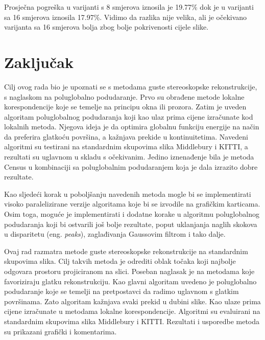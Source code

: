 \documentclass[utf8, zavrsni, numeric]{fer}
\begin{document}
Prosječna pogreška u varijanti s 8 smjerova iznosila je 19.77\% dok je u varijanti sa 16
smjerova iznosila 17.97\%. Vidimo da razlika nije velika, ali je očekivano varijanta sa 16 smjerova bolja zbog bolje pokrivenosti cijele slike.

\chapter{Zaključak}
Cilj ovog rada bio je upoznati se s metodama guste stereoskopske rekonstrukcije, s naglaskom
na poluglobalno podudaranje. Prvo su obrađene metode lokalne korespondencije koje se temelje
na principu okna ili prozora. Zatim je uveden algoritam poluglobalnog podudaranja koji kao ulaz
prima cijene izračunate kod lokalnih metoda. Njegova ideja je da optimira globalnu funkciju energije na način da preferira glatkoću površina, a kažnjava prekide u kontinuitetima.
Navedeni algoritmi su testirani na standardnim skupovima slika Middlebury i KITTI, a rezultati
su uglavnom u skladu s očekivanim. Jedino iznenađenje bila je metoda Census u kombinaciji sa poluglobalnim podudaranjem koja je dala izrazito dobre rezultate.

Kao sljedeći korak u poboljšanju navedenih metoda mogle bi se implementirati visoko paralelizirane verzije algoritama
koje bi se izvodile na grafičkim karticama. Osim toga, moguće je implementirati i dodatne
korake u algoritmu poluglobalnog podudaranja koji bi ostvarili još bolje rezultate, poput
uklanjanja naglih skokova u disparitetu (eng. {\sl peaks}), zaglađivanja Gaussovim filtrom i tako dalje.




\begin{sazetak}
  Ovaj rad razmatra metode guste stereoskopske rekonstrukcije na standardnim skupovima slika.
  Cilj takvih metoda je odrediti oblak točaka koji najbolje odgovara prostoru projiciranom
  na slici.
  Poseban naglasak je na metodama koje favoriziraju glatku rekonstrukciju. Kao glavni
  algoritam uvedeno je poluglobalno podudaranje koje se temelji na pretpostavci da radimo
  uglavnom s glatkim površinama. Zato algoritam kažnjava svaki prekid u dubini slike. Kao
  ulaze prima cijene izračunate u metodama lokalne korespondencije. Algoritmi su
  evaluirani na standardnim skupovima slika Middlebury i KITTI. Rezultati i usporedbe metoda su prikazani
  grafički i komentarima.

\end{sazetak}
\end{document}
